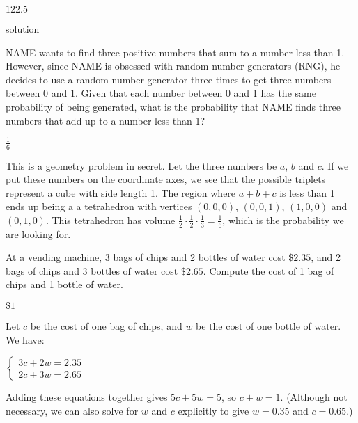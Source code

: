\documentclass[11pt]{article}
\begin{document}
\begin{answer}
$122.5$
\end{answer}

\begin{solution}
solution
\end{solution}


\begin{problem} %
NAME wants to find three positive numbers that sum to a number less than 1. However, since NAME is obsessed with random number generators (RNG), he decides to use a random number generator three times to get three numbers between 0 and 1. Given that each number between 0 and 1 has the same probability of being generated, what is the probability that NAME finds three numbers that add up to a number less than 1?
\end{problem}

\begin{answer}
$\frac{1}{6}$
\end{answer}

\begin{solution}
This is a geometry problem in secret. Let the three numbers be $a$, $b$ and $c$. If we put these numbers on the coordinate axes, we see that the possible triplets represent a cube with side length 1. The region where $a + b + c$ is less than 1 ends up being a a tetrahedron with vertices $(0, 0, 0)$, $(0, 0, 1)$, $(1, 0, 0)$ and $(0, 1, 0)$. This tetrahedron has volume $\frac{1}{2} \cdot \frac{1}{2} \cdot \frac{1}{3} = \frac{1}{6}$, which is the probability we are looking for.
\end{solution}


\begin{problem}
At a vending machine, 3 bags of chips and 2 bottles of water cost $\$2.35$, and 2 bags of chips and 3 bottles of water cost $\$2.65$. Compute the cost of 1 bag of chips and 1 bottle of water.
\end{problem}

\begin{answer}
$\boxed{\$1}$
\end{answer}

\begin{solution}
Let $c$ be the cost of one bag of chips, and $w$ be the cost of one bottle of water. We have: \begin{center}$\begin{cases} 3c + 2w = 2.35 \\ 2c + 3w = 2.65 \end{cases}$\end{center} Adding these equations together gives $5c + 5w = 5$, so $c + w = \boxed{1}$. (Although not necessary, we can also solve for $w$ and $c$ explicitly to give $w = 0.35$ and $c = 0.65$.)
\end{solution}
\end{document}
